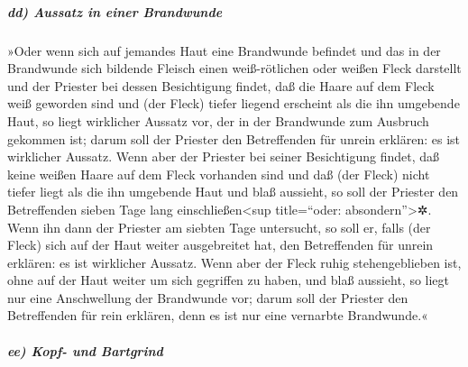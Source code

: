 \hypertarget{dd-aussatz-in-einer-brandwunde}{%
\subparagraph{dd) Aussatz in einer
Brandwunde}\label{dd-aussatz-in-einer-brandwunde}}

»Oder wenn sich auf jemandes Haut eine Brandwunde
befindet und das in der Brandwunde sich bildende Fleisch einen
weiß-rötlichen oder weißen Fleck darstellt und der
Priester bei dessen Besichtigung findet, daß die Haare auf dem Fleck
weiß geworden sind und (der Fleck) tiefer liegend erscheint als die ihn
umgebende Haut, so liegt wirklicher Aussatz vor, der in der Brandwunde
zum Ausbruch gekommen ist; darum soll der Priester den Betreffenden für
unrein erklären: es ist wirklicher Aussatz. Wenn aber der
Priester bei seiner Besichtigung findet, daß keine weißen Haare auf dem
Fleck vorhanden sind und daß (der Fleck) nicht tiefer liegt als die ihn
umgebende Haut und blaß aussieht, so soll der Priester den Betreffenden
sieben Tage lang einschließen\textless sup title=``oder:
absondern''\textgreater✲. Wenn ihn dann der Priester am
siebten Tage untersucht, so soll er, falls (der Fleck) sich auf der Haut
weiter ausgebreitet hat, den Betreffenden für unrein erklären: es ist
wirklicher Aussatz. Wenn aber der Fleck ruhig
stehengeblieben ist, ohne auf der Haut weiter um sich gegriffen zu
haben, und blaß aussieht, so liegt nur eine Anschwellung der Brandwunde
vor; darum soll der Priester den Betreffenden für rein erklären, denn es
ist nur eine vernarbte Brandwunde.«

\hypertarget{ee-kopf--und-bartgrind}{%
\subparagraph{ee) Kopf- und Bartgrind}\label{ee-kopf--und-bartgrind}}

